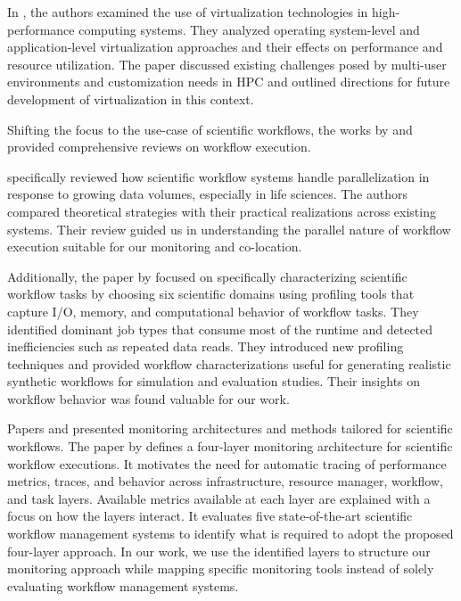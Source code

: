 In \cite{9653557}, the authors examined the use of virtualization technologies in high-performance computing systems. They analyzed operating system-level and application-level virtualization approaches and their effects on performance and resource utilization. The paper discussed existing challenges posed by multi-user environments and customization needs in HPC and outlined directions for future development of virtualization in this context.

Shifting the focus to the use-case of scientific workflows, the works by \cite{Bux2013} and \cite{JUVE2013682} provided comprehensive reviews on workflow execution.

\cite{Bux2013} specifically reviewed how scientific workflow systems handle parallelization in response to growing data volumes, especially in life sciences. The authors compared theoretical strategies with their practical realizations across existing systems. Their review guided us in understanding the parallel nature of workflow execution suitable for our monitoring and co-location.

Additionally, the paper by \cite{JUVE2013682} focused on specifically characterizing scientific workflow tasks by choosing six scientific domains using profiling tools that capture I/O, memory, and computational behavior of workflow tasks. They identified dominant job types that consume most of the runtime and detected inefficiencies such as repeated data reads. They introduced new profiling techniques and provided workflow characterizations useful for generating realistic synthetic workflows for simulation and evaluation studies. Their insights on workflow behavior was found valuable for our work.

Papers \cite{Bader_2022} and \cite{Witzke2024} presented monitoring architectures and methods tailored for scientific workflows.
The paper by \cite{Bader_2022} defines a four-layer monitoring architecture for scientific workflow executions. It motivates the need for automatic tracing of performance metrics, traces, and behavior across infrastructure, resource manager, workflow, and task layers. Available metrics available at each layer are explained with a focus on how the layers interact. It evaluates five state-of-the-art scientific workflow management systems to identify what is required to adopt the proposed four-layer approach. In our work, we use the identified layers to structure our monitoring approach while mapping specific monitoring tools instead of solely evaluating workflow management systems.

